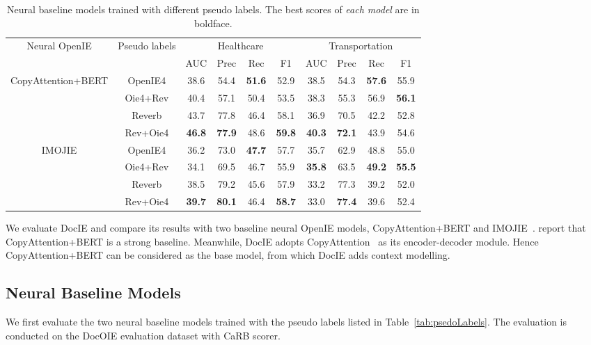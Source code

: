 \documentclass[11pt,a4paper]{article}
\newcommand{\dname}{DocOIE\xspace}
\newcommand{\mname}{DocIE\xspace}
\begin{document}
\begin{table*}[!t]
\centering
\begin{tabular}{ c|c|cccc|cccc}
 \toprule
 \multirow{2}{*}{Neural OpenIE} &
 \multirow{2}{*}{Pseudo labels} &
  \multicolumn{4}{c|}{Healthcare} &
  \multicolumn{4}{c}{Transportation} \\
  & & AUC & Prec & Rec & F1 & AUC & Prec & Rec & F1\\
 \midrule
 \multirow{4}{*}{CopyAttention+BERT} &
  OpenIE4 &38.6 & 54.4 & \textbf{51.6} & 52.9        &38.5 & 54.3 & \textbf{57.6} & 55.9\\
  & Oie4+Rev & 40.4 & 57.1 & 50.4 & 53.5                &38.3 & 55.3 & 56.9 & \textbf{56.1}\\
  & Reverb & 43.7 & 77.8 & 46.4 & 58.1          & 36.9 & 70.5 & 42.2 & 52.8\\
  & Rev+Oie4 & \textbf{46.8} & \textbf{77.9} & 48.6 & \textbf{59.8}     &\textbf{40.3} & \textbf{72.1} & 43.9 & 54.6\\
 \midrule
 \multirow{4}{*}{IMOJIE} &
  OpenIE4 & 36.2 & 73.0 & \textbf{47.7} & 57.7        & 35.7 & 62.9 & 48.8 & 55.0\\
  & Oie4+Rev & 34.1 & 69.5 & 46.7 & 55.9             &\textbf{35.8} & 63.5 & \textbf{49.2} & \textbf{55.5}\\
  & Reverb & 38.5 & 79.2 & 45.6 & 57.9          & 33.2 & 77.3 & 39.2 & 52.0\\
  & Rev+Oie4 & \textbf{39.7} & \textbf{80.1} & 46.4 & \textbf{58.7}     &33.0 & \textbf{77.4} & 39.6 & 52.4\\
  \bottomrule
\end{tabular}
\caption{Neural baseline models trained with different pseudo labels. The best scores of \textit{each model} are in boldface.}
\label{tab:baseline_systems}
\end{table*}

We evaluate \mname and compare its results with two baseline neural OpenIE models, CopyAttention+BERT and IMOJIE~\cite{kolluru2020imojie}. \citet{kolluru2020imojie} report that CopyAttention+BERT is a strong baseline. Meanwhile, \mname adopts CopyAttention~\cite{cui2018neural} as its encoder-decoder module. Hence CopyAttention+BERT can be considered as the base model, from which \mname adds context modelling.  

\subsection{Neural Baseline Models}
We first evaluate the two neural baseline models trained with the pseudo labels listed in Table~\ref{tab:psedoLabels}. The evaluation is conducted on the \dname evaluation dataset with CaRB scorer.
\end{document}
